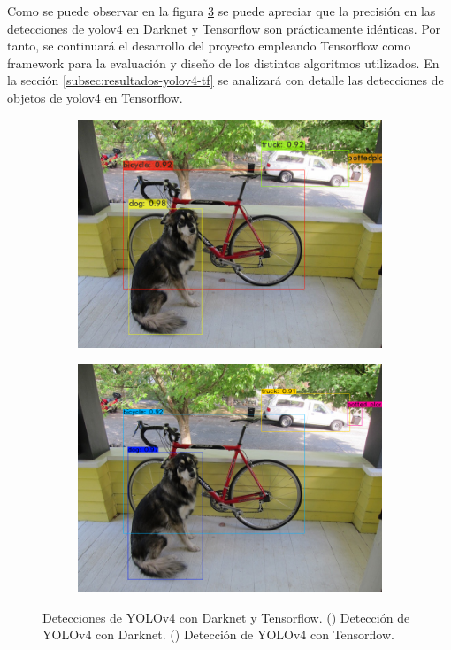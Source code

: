 Como se puede observar en la figura \ref{fig:predictions-darknet-tf} se puede apreciar que la precisión en las detecciones de \gls{yolov4} en Darknet y Tensorflow son prácticamente idénticas. Por tanto, se continuará el desarrollo del proyecto empleando Tensorflow como framework para la evaluación y diseño de los distintos algoritmos utilizados. En la sección \ref{subsec:resultados-yolov4-tf} se analizará con detalle las detecciones de objetos de \gls{yolov4} en Tensorflow.

\begin{figure}[ht]
  \centering
  \begin{subfigure}[b]{0.35\textwidth}
    \includegraphics[width=\textwidth]{img/chapters/desarrollo/predictions.jpg}
    \caption{}
    \label{fig:predictions-darknet}
  \end{subfigure}
  \qquad\qquad
  \begin{subfigure}[b]{0.35\textwidth}
    \includegraphics[width=\textwidth]{img/chapters/desarrollo/detection1.png}
    \caption{}
    \label{fig:predictions-tf}
  \end{subfigure}
  \caption{Detecciones de YOLOv4 con Darknet y Tensorflow.
    (\protect{}) Detección de YOLOv4 con Darknet.
    (\protect{}) Detección de YOLOv4 con Tensorflow.}
  \label{fig:predictions-darknet-tf}
\end{figure}

